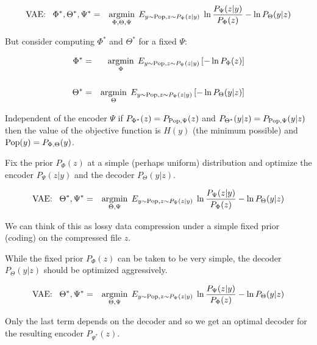 {

{\huge
\begin{eqnarray*}
\mbox{VAE:}\;\;\;\Phi^*,\Theta^*,\Psi^* &  = & \operatorname*{argmin}_{\Phi,\Theta,\Psi}\;E_{y\sim \mathrm{Pop},z\sim P_\Psi(z|y)}  \;\ln \frac{P_\Psi(z|y)}{P_\Phi(z)}  - \ln P_\Theta(y|z)
\end{eqnarray*}

But consider computing $\Phi^*$ and $\Theta^*$ for a fixed $\Psi$:

\begin{eqnarray*}
\Phi^* & = & \operatorname*{argmin}_\Phi\;E_{y \sim \mathrm{Pop},z \sim P_\Psi(z|y)}\left[ -\ln P_\Phi(z)\right] \\
\\
\Theta^* & = & \operatorname*{argmin}  _\Theta\; E_{y \sim \mathrm{Pop},z \sim P_\Psi(z|y)}\left[-\ln P_\Theta(y|z)\right]
\end{eqnarray*}

\vfill
{\color{red} Independent of the encoder $\Psi$} if $P_{\Phi^*}(z) = P_{\mathrm{Pop},\Psi}(z)$ and $P_{\Theta^*}(y|z) = P_{\mathrm{Pop},\Psi}(y|z)$ then the value of the objective function
is $H(y)$ (the minimum possible) and $\mathrm{Pop}(y) = P_{\Phi,\Theta}(y)$.

}


Fix the prior $P_\Phi(z)$ at a simple (perhaps uniform) distribution and optimize the encoder $P_\Psi(z|y)$ and the decoder $P_\Theta(y|z)$.

{\huge
\begin{eqnarray*}
\mbox{VAE:}\;\;\;\Theta^*,\Psi^* &  = & \operatorname*{argmin}_{\Theta,\Psi}\;E_{y\sim \mathrm{Pop},z\sim P_\Psi(z|y)}  \;\ln \frac{P_\Psi(z|y)}{P_\Phi(z)}  - \ln P_\Theta(y|z)
\end{eqnarray*}
}

We can think of this as lossy data compression under a simple fixed prior (coding) on the compressed file $z$.

\vfill
While the fixed prior $P_\Phi(z)$ can be taken to be very simple, the decoder $P_\Theta(y|z)$ should be optimized aggressively.


{\huge
\begin{eqnarray*}
\mbox{VAE:}\;\;\;\Theta^*,\Psi^* &  = & \operatorname*{argmin}_{\Theta,\Psi}\;E_{y\sim \mathrm{Pop},z\sim P_\Psi(z|y)}  \;\ln \frac{P_\Psi(z|y)}{P_\Phi(z)}  - \ln P_\Theta(y|z)
\end{eqnarray*}
}

\vfill
{\huge
Only the last term depends on the decoder and so we get an optimal decoder for the resulting encoder $P_{\Psi^*}(z)$.

}}

